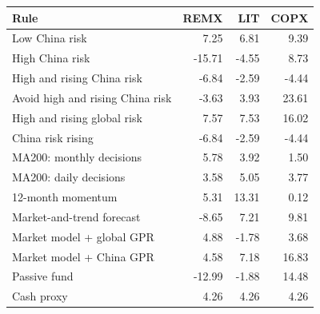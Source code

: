 \begin{tabular}{@{}lrrr@{}}
\toprule
Rule & REMX & LIT & COPX \\
\midrule
Low China risk & 7.25 & 6.81 & 9.39 \\
High China risk & -15.71 & -4.55 & 8.73 \\
High and rising China risk & -6.84 & -2.59 & -4.44 \\
Avoid high and rising China risk & -3.63 & 3.93 & 23.61 \\
High and rising global risk & 7.57 & 7.53 & 16.02 \\
China risk rising & -6.84 & -2.59 & -4.44 \\
MA200: monthly decisions & 5.78 & 3.92 & 1.50 \\
MA200: daily decisions & 3.58 & 5.05 & 3.77 \\
12-month momentum & 5.31 & 13.31 & 0.12 \\
Market-and-trend forecast & -8.65 & 7.21 & 9.81 \\
Market model + global GPR & 4.88 & -1.78 & 3.68 \\
Market model + China GPR & 4.58 & 7.18 & 16.83 \\
Passive fund & -12.99 & -1.88 & 14.48 \\
Cash proxy & 4.26 & 4.26 & 4.26 \\
\bottomrule
\end{tabular}